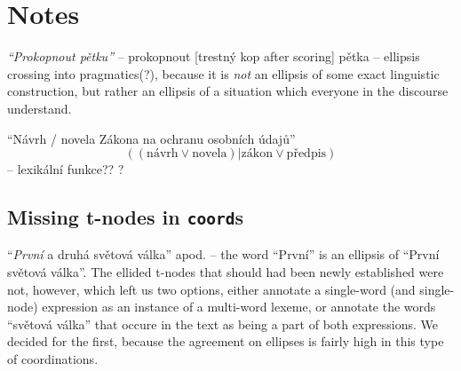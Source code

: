 \documentclass[11pt, a4paper]{article}
\def\code{\texttt}
\begin{document}
\newpage
\section{Notes}

{\em``Prokopnout pětku''} -- prokopnout [trestný kop after scoring] pětka -- ellipsis crossing into pragmatics(?), because it is {\em not} an ellipsis of some exact linguistic construction, but rather an ellipsis of a situation which everyone in the discourse understand.  

``Návrh / novela Zákona na ochranu osobních údajů''  $$((\mathrm{návrh} \lor \mathrm{novela}) | \mathrm{zákon} \lor \mathrm{předpis})$$
-- lexikální funkce?? \citep{wanner} ?

\subsection{Missing t-nodes in \code{coord}s}
``\textit{První} a druhá světová válka'' apod. -- the word ``První'' is an ellipsis of ``První světová válka''. The ellided t-nodes that should had been newly established were not, however, which left us two options, either annotate a single-word (and single-node) expression as an instance of a multi-word lexeme, or annotate the words ``světová válka'' that occure in the text as being a part of both expressions. We decided for the first, because the agreement on ellipses is fairly high in this type of coordinations.



\end{document}
